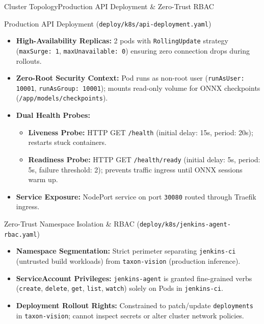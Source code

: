 \begin{frame}{Cluster Topology}{Production API Deployment \& Zero-Trust RBAC}
    \begin{block}{Production API Deployment (\texttt{deploy/k8s/api-deployment.yaml})}
        \begin{itemize}\tiny
            \item \textbf{High-Availability Replicas:} 2 pods with \texttt{RollingUpdate} strategy (\texttt{maxSurge: 1}, \texttt{maxUnavailable: 0}) ensuring zero connection drops during rollouts.
            \item \textbf{Zero-Root Security Context:} Pod runs as non-root user (\texttt{runAsUser: 10001}, \texttt{runAsGroup: 10001}); mounts read-only volume for ONNX checkpoints (\texttt{/app/models/checkpoints}).
            \item \textbf{Dual Health Probes:}
            \begin{itemize}\tiny
                \item \textbf{Liveness Probe:} HTTP GET \texttt{/health} (initial delay: 15s, period: 20s); restarts stuck containers.
                \item \textbf{Readiness Probe:} HTTP GET \texttt{/health/ready} (initial delay: 5s, period: 5s, failure threshold: 2); prevents traffic ingress until ONNX sessions warm up.
            \end{itemize}
            \item \textbf{Service Exposure:} NodePort service on port \texttt{30080} routed through Traefik ingress.
        \end{itemize}
    \end{block}

    \vspace{-0.05cm}

    \begin{block}{Zero-Trust Namespace Isolation \& RBAC (\texttt{deploy/k8s/jenkins-agent-rbac.yaml})}
        \begin{itemize}\tiny
            \item \textbf{Namespace Segmentation:} Strict perimeter separating \texttt{jenkins-ci} (untrusted build workloads) from \texttt{taxon-vision} (production inference).
            \item \textbf{ServiceAccount Privileges:} \texttt{jenkins-agent} is granted fine-grained verbs (\texttt{create}, \texttt{delete}, \texttt{get}, \texttt{list}, \texttt{watch}) solely on Pods in \texttt{jenkins-ci}.
            \item \textbf{Deployment Rollout Rights:} Constrained to patch/update \texttt{deployments} in \texttt{taxon-vision}; cannot inspect secrets or alter cluster network policies.
        \end{itemize}
    \end{block}


\end{frame}

